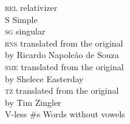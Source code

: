 \begin{multicols}{2}
\begin{tabbing}
\textsc{rel}      \> relativizer\\
S                 \> Simple\\
\textsc{sg}       \> singular\\
\textsc{rns}      \> translated from the original\\ \> by Ricardo Napoleão de Souza\\
\textsc{sme}      \> translated from the original\\ \> by Shelece Easterday\\
\textsc{tz}       \> translated from the original\\ \> by Tim Zingler\\
V-less \#s        \> Words without vowels
\end{tabbing}
\end{multicols}
